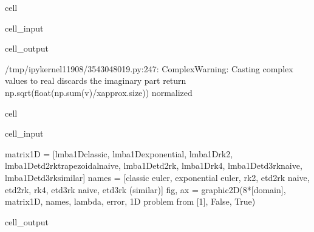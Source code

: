 \documentclass[letterpaper,10pt,english]{jupyterBook}
\begin{document}
\begin{sphinxuseclass}{cell}
\begin{sphinxVerbatimInput}
\begin{sphinxuseclass}{cell_input}
\end{sphinxuseclass}\end{sphinxVerbatimInput}
\begin{sphinxVerbatimOutput}

\begin{sphinxuseclass}{cell_output}
\begin{sphinxVerbatim}[commandchars=\\\{\}]
/tmp/ipykernel\PYGZus{}11908/3543048019.py:247: ComplexWarning: Casting complex values to real discards the imaginary part
  return np.sqrt(float(np.sum(v)/x\PYGZus{}approx.size)) \PYGZsh{}normalized
\end{sphinxVerbatim}

\end{sphinxuseclass}\end{sphinxVerbatimOutput}

\end{sphinxuseclass}
\begin{sphinxuseclass}{cell}\begin{sphinxVerbatimInput}

\begin{sphinxuseclass}{cell_input}
\begin{sphinxVerbatim}[commandchars=\\\{\}]
matrix\PYGZus{}1D = [lmba\PYGZus{}1D\PYGZus{}classic, lmba\PYGZus{}1D\PYGZus{}exponential, lmba\PYGZus{}1D\PYGZus{}rk2, lmba\PYGZus{}1D\PYGZus{}etd2rk\PYGZus{}trapezoidal\PYGZus{}naive, lmba\PYGZus{}1D\PYGZus{}etd2rk, lmba\PYGZus{}1D\PYGZus{}rk4, lmba\PYGZus{}1D\PYGZus{}etd3rk\PYGZus{}naive, lmba\PYGZus{}1D\PYGZus{}etd3rk\PYGZus{}similar]
names = [\PYGZsq{}classic euler\PYGZsq{}, \PYGZsq{}exponential euler\PYGZsq{}, \PYGZsq{}rk2\PYGZsq{}, \PYGZsq{}etd2rk naive\PYGZsq{}, \PYGZsq{}etd2rk\PYGZsq{}, \PYGZsq{}rk4\PYGZsq{}, \PYGZsq{}etd3rk naive\PYGZsq{}, \PYGZdq{}etd3rk (similar)\PYGZdq{}]
fig, ax = graphic\PYGZus{}2D(8*[domain], matrix\PYGZus{}1D, names, \PYGZdq{}lambda\PYGZdq{}, \PYGZdq{}error\PYGZdq{}, \PYGZdq{}1D problem from [1]\PYGZdq{}, False, True)
\end{sphinxVerbatim}

\end{sphinxuseclass}\end{sphinxVerbatimInput}
\begin{sphinxVerbatimOutput}

\begin{sphinxuseclass}{cell_output}
\noindent{}

\end{sphinxuseclass}\end{sphinxVerbatimOutput}

\end{sphinxuseclass}
\end{document}

